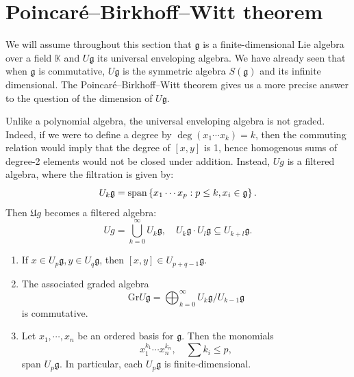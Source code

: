\documentclass{report}
\begin{document}
\section{Poincaré--Birkhoff--Witt theorem}
We will assume throughout this section that $\mathfrak g$ is a finite-dimensional Lie algebra over a field $\mathbb K$ and $U \mathfrak g$ its universal enveloping algebra.
We have already seen that when $\mathfrak g$ is commutative, $U \mathfrak g$ is the symmetric algebra $S(\mathfrak g)$ and its infinite dimensional.
The Poincaré--Birkhoff--Witt theorem gives us a more precise answer to the question of the dimension of $U \mathfrak g$.

Unlike a polynomial algebra, the universal enveloping algebra is not graded.
Indeed, if we were to define a degree by $\deg(x_1 \cdots x_k) = k$, then the commuting relation would imply that the degree of $[x,y]$ is 1, hence homogenous sums of degree-2 elements would not be closed under addition.
Instead, $ U g$ is a filtered algebra, where the filtration is given by:
\[
U_k \mathfrak g = \operatorname{span}\left\{ x_1 \cdots x_p: p \leq k, x_i \in \mathfrak g \right\}.
\]
Then $\mathfrak U g $ becomes a filtered algebra:
\[
U g = \bigcup_{k=0}^\infty U_k \mathfrak g, \quad U_k \mathfrak g \cdot U_l \mathfrak g \subseteq U_{k+l} \mathfrak g.
\]
\begin{proposition}
    \begin{enumerate}[label = (\roman*)]
        \item If $x \in U_p \mathfrak g, y \in U_q \mathfrak g$, then $[x,y] \in U_{p+q-1} \mathfrak g$.
        \item The associated graded algebra
        \[
        \mathrm{Gr}U \mathfrak g = \bigoplus_{k=0}^\infty U_k \mathfrak g / U_{k-1} \mathfrak g
        \]
        is commutative.
        \item Let $x_1, \cdots, x_n$ be an ordered basis for $\mathfrak g$.
        Then the monomials
        \[
        x_1^{k_1} \cdots x_n^{k_n}, \quad \sum k_i \leq p,
        \]
        span $U_p \mathfrak g$. 
        In particular, each $U_p \mathfrak g$ is finite-dimensional.
    \end{enumerate}
\end{proposition}
\end{document}
